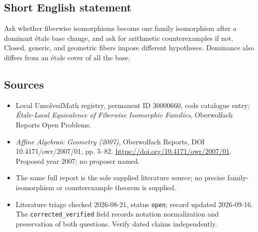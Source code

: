 \documentclass[11pt]{article}
\begin{document}
\subsection{Short English statement}
Ask whether fiberwise isomorphisms become one family isomorphism after a dominant \'etale base change, and ask for arithmetic counterexamples if not. Closed, generic, and geometric fibers impose different hypotheses. Dominance also differs from an \'etale cover of all the base.
\subsection{Sources}
\begin{itemize}\item Local UnsolvedMath registry, permanent ID 30000660, code catalogue entry; \emph{\'Etale-Local Equivalence of Fiberwise Isomorphic Families}, Oberwolfach Reports Open Problems.\item \emph{Affine Algebraic Geometry (2007)}, Oberwolfach Reports, DOI 10.4171/owr/2007/01, pp. 5--82. \url{https://doi.org/10.4171/owr/2007/01}. Proposed year 2007; no proposer named.\item The same full report is the sole supplied literature source; no precise family-isomorphism or counterexample theorem is supplied.\item Literature triage checked 2026-08-21, status \texttt{open}; record updated 2026-09-16. The \texttt{corrected\_verified} field records notation normalization and preservation of both questions. Verify dated claims independently.\end{itemize}
\end{document}
